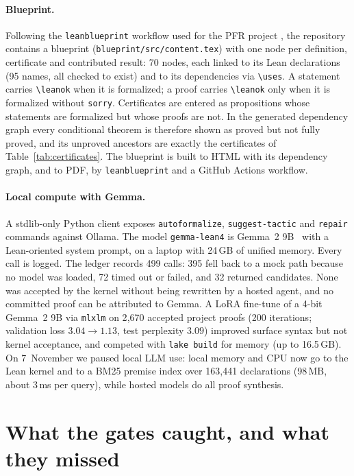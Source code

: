 \documentclass[11pt]{article}
\renewcommand{\_}{\origus\allowbreak}
\newcommand{\code}[1]{\texttt{#1}}
\begin{document}
\paragraph{Blueprint.} Following the \code{leanblueprint} workflow used for the PFR project
\cite{TaoPFR}, the repository contains a blueprint (\code{blueprint/src/content.tex}) with one node
per definition, certificate and contributed result: 70 nodes, each linked to its Lean declarations
(95 names, all checked to exist) and to its dependencies via \verb|\uses|. A statement carries
\verb|\leanok| when it is formalized; a proof carries \verb|\leanok| only when it is formalized without
\code{sorry}. Certificates are entered as propositions whose statements are formalized but whose
proofs are not. In the generated dependency graph every conditional theorem is therefore shown as
proved but not fully proved, and its unproved ancestors are exactly the certificates of
Table~\ref{tab:certificates}. The blueprint is built to HTML with its dependency graph, and to PDF,
by \code{leanblueprint} and a GitHub Actions workflow.

\paragraph{Local compute with Gemma.} A stdlib-only Python client exposes \code{autoformalize},
\code{suggest-tactic} and \code{repair} commands against Ollama. The model \code{gemma-lean4} is
Gemma~2 9B~\cite{Gemma2} with a Lean-oriented system prompt, on a laptop with 24\,GB of unified
memory. Every call is logged. The ledger records 499 calls: 395 fell back to a mock path because no
model was loaded, 72 timed out or failed, and 32 returned candidates. None was accepted by the
kernel without being rewritten by a hosted agent, and no committed proof can be attributed to
Gemma. A LoRA fine-tune of a 4-bit Gemma~2 9B via \code{mlx\_lm} on 2{,}670 accepted project proofs
(200 iterations; validation loss $3.04\to1.13$, test perplexity $3.09$) improved surface syntax but
not kernel acceptance, and competed with \code{lake build} for memory (up to 16.5\,GB). On
7~November we paused local LLM use: local memory and CPU now go to the Lean kernel and to a BM25
premise index over 163{,}441 declarations (98\,MB, about 3\,ms per query), while hosted models do
all proof synthesis.

\section{What the gates caught, and what they missed}
\end{document}
